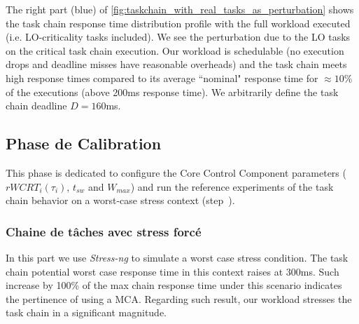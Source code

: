 \documentclass[french, a4paper, 11pt, twoside, pdftex]{StyleThese}
\begin{document}
                    
                    
                        The right part (blue) of \autoref{fig:taskchain_with_real_tasks_as_perturbation} shows the task chain response time distribution profile with the full workload executed (i.e. LO-criticality tasks included). We see the perturbation due to the LO tasks on the critical task chain execution. Our workload is schedulable (no execution drops and deadline misses have reasonable overheads) and the task chain meets high response times compared to its average ``nominal" response time for $\approx10\%$ of the executions (above 200ms response time). We arbitrarily define the task chain deadline $D = 160$ms. 
                        
        \subsection{Phase de Calibration}
                    This phase is dedicated to configure the Core Control Component parameters  ($rWCRT_i(\tau_i)$, $t_{sw}$ and $W_{max}$) and run the reference experiments of the task chain behavior on a worst-case stress context (step~\circleTxt[4]).
     
            \subsubsection{Chaine de tâches avec stress forcé}
                        In this part we use \textit{Stress-ng} to simulate a worst case stress condition. The task chain potential worst case response time in this context raises at 300ms.
                        Such increase by 100\% of the max chain response time under this scenario indicates the pertinence of using a MCA. Regarding such result, our workload stresses the task chain in a significant magnitude.
                        
\end{document}
